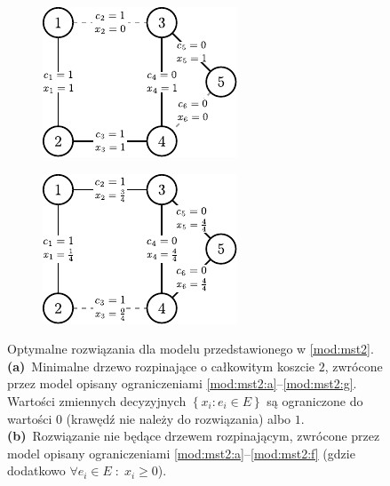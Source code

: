 \begin{figure}[!h]
	\null\hfill
	\begin{subfigure}[b]{0.27\textwidth}
		\includegraphics[width=\textwidth]{Chapter_III/MST3-example/a}
		\caption{}
		\label{fig:mst3Example:a}
	\end{subfigure}
	\hfill
	\begin{subfigure}[b]{0.27\textwidth}
		\includegraphics[width=\textwidth]{Chapter_III/MST3-example/b}
		\caption{}
		\label{fig:mst3Example:b}
	\end{subfigure}
	\hfill\null
	\caption{
		Optymalne rozwiązania dla modelu przedstawionego w \ref{mod:mst2}.
		\textbf{(a)}~Minimalne drzewo rozpinające o całkowitym koszcie $2$, zwrócone przez model opisany ograniczeniami \ref{mod:mst2:a}--\ref{mod:mst2:g}. Wartości zmiennych decyzyjnych $\left\{ x_{i} : e_{i} \in E \right\}$ są ograniczone do wartości $0$ (krawędź nie należy do rozwiązania) albo $1$.
		\textbf{(b)}~Rozwiązanie nie będące drzewem rozpinającym, zwrócone przez model opisany ograniczeniami \ref{mod:mst2:a}--\ref{mod:mst2:f} (gdzie dodatkowo $\forall e_{i} \in E \; : \; x_{i} \geqslant 0$).
	}
	\label{fig:mst3Example}
\end{figure}

